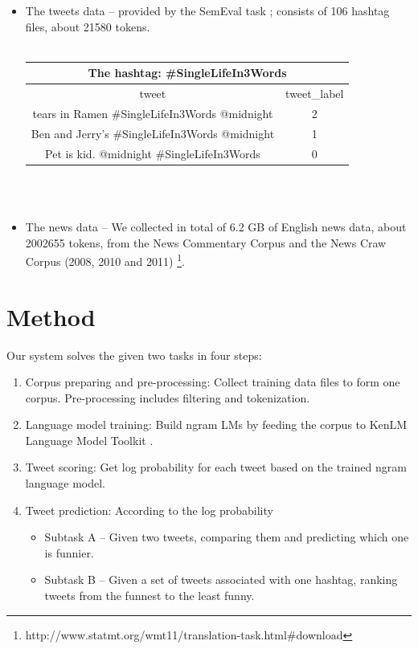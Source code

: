 \documentclass[a0,portrait]{a0poster}
\begin{document}
\begin{multicols}{2}
\begin{itemize}
\item The tweets data -- provided by the SemEval task ; consists of 106 hashtag files, about 21580 tokens.\\\\
\begin{tabular}{ c | c } 
\toprule
\multicolumn{2}{c}{The hashtag:	\#SingleLifeIn3Words} \\
\hline
tweet & tweet\_label\\ 
\hline
tears in Ramen \#SingleLifeIn3Words @midnight & 2 \\ 
\hline
Ben and Jerry's \#SingleLifeIn3Words @midnight & 1 \\
\hline
Pet is kid. @midnight \#SingleLifeIn3Words & 0 \\
\bottomrule
\end{tabular}
\\\\
\item The news data -- We collected in total of 6.2 GB of English news data, about 2002655 tokens, from the News Commentary Corpus and the News Craw Corpus (2008, 2010 and 2011) \footnote{http://www.statmt.org/wmt11/translation-task.html\#download}.
\end{itemize}





\color{DarkSlateGray} %
\section*{\LARGE Method}
Our system solves the given two tasks in four steps:
\begin{enumerate}
\item Corpus preparing and pre-processing: Collect training data files to form one corpus. Pre-processing includes filtering and tokenization.
\item Language model training: Build ngram LMs by feeding the corpus to KenLM Language Model Toolkit \cite{Heafield-estimate}. 
\item Tweet scoring: Get log probability for each tweet based on the trained ngram language model.
\item Tweet prediction: According to the log probability
\begin{itemize}
\item Subtask A -- Given two tweets, comparing them and predicting which one is funnier. 
\item Subtask B -- Given a set of tweets associated with one hashtag, ranking tweets from the funnest to the least funny.
\end{itemize}
\end{enumerate}


\end{multicols}
\end{document}
